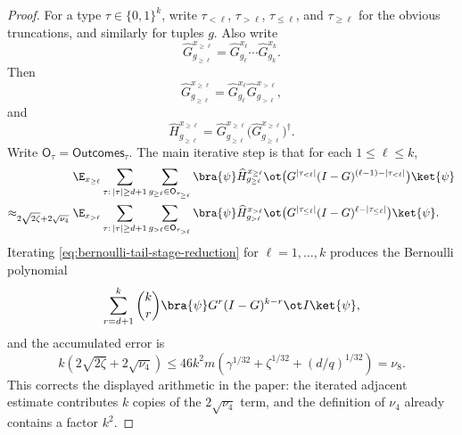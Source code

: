\begin{proof}
	\leanok
	For a type $\tau \in \{0,1\}^k$, write $\tau_{<\ell}$, $\tau_{>\ell}$, $\tau_{\le \ell}$, and $\tau_{\ge \ell}$ for the obvious truncations, and similarly for tuples $g$. Also write
	\[
		\widehat G_{g_{\ge \ell}}^{x_{\ge \ell}}
		=
		\widehat G_{g_\ell}^{x_\ell}\cdots \widehat G_{g_k}^{x_k}.
	\]
	Then
	\begin{equation}\label{eq:G-recurrence}
		\widehat G_{g_{\ge \ell}}^{x_{\ge \ell}}
		=
		\widehat G_{g_\ell}^{x_\ell}\widehat G_{g_{>\ell}}^{x_{>\ell}},
	\end{equation}
	and
	\begin{equation}\label{eq:split-H-into-two-Gs}
		\widehat H_{g_{\ge \ell}}^{x_{\ge \ell}}
		=
		\widehat G_{g_{\ge \ell}}^{x_{\ge \ell}}
		\bigl(\widehat G_{g_{\ge \ell}}^{x_{\ge \ell}}\bigr)^\dagger.
	\end{equation}
	Write $\mathsf O_\tau = \mathsf{Outcomes}_\tau$. The main iterative step is that for each $1\le \ell \le k$,
	\begin{align}
		                                         & \E_{x_{\ge \ell}} \sum_{\tau:\,|\tau|\ge d+1} \sum_{g_{\ge \ell}\in \mathsf O_{\tau_{\ge \ell}}}
		\bra{\psi} \widehat H_{g_{\ge \ell}}^{x_{\ge \ell}}
		\ot \bigl(G^{|\tau_{<\ell}|}(I-G)^{(\ell-1)-|\tau_{<\ell}|}\bigr)\ket{\psi}\nonumber                                                        \\
		\approx_{2\sqrt{2\zeta}+2\sqrt{\nu_4}}{} &
		\E_{x_{>\ell}} \sum_{\tau:\,|\tau|\ge d+1} \sum_{g_{>\ell}\in \mathsf O_{\tau_{>\ell}}}
		\bra{\psi} \widehat H_{g_{>\ell}}^{x_{>\ell}}
		\ot \bigl(G^{|\tau_{\le \ell}|}(I-G)^{\ell-|\tau_{\le \ell}|}\bigr)\ket{\psi}.
		\label{eq:bernoulli-tail-stage-reduction}
	\end{align}
	Iterating \ref{eq:bernoulli-tail-stage-reduction} for $\ell=1,\dots,k$ produces the Bernoulli polynomial
	\[
		\sum_{r=d+1}^k \binom{k}{r} \bra{\psi} G^r(I-G)^{k-r} \ot I \ket{\psi},
	\]
	and the accumulated error is
	\[
		k(2\sqrt{2\zeta}+2\sqrt{\nu_4})
		\le
		46k^2m\left(\gamma^{1/32}+\zeta^{1/32}+(d/q)^{1/32}\right)
		= \nu_8.
	\]
	This corrects the displayed arithmetic in the paper: the iterated adjacent
	estimate contributes $k$ copies of the $2\sqrt{\nu_4}$ term, and the
	definition of $\nu_4$ already contains a factor $k^2$.


\end{proof}
